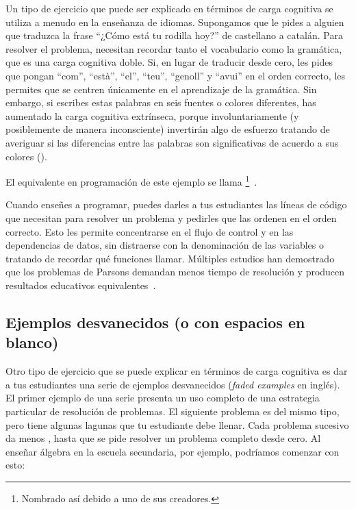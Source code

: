 Un tipo de ejercicio que puede ser explicado en términos de carga cognitiva
se utiliza a menudo en la enseñanza de idiomas.
Supongamos que le pides a alguien que traduzca la frase
``¿Cómo está tu rodilla hoy?'' de castellano a catalán.
Para resolver el problema, necesitan recordar tanto el vocabulario
como la gramática, que es una carga cognitiva doble.
Si, en lugar de traducir desde cero, les pides que pongan ``com'', ``està'', ``el'', ``teu'', ``genoll'' y ``avui'' en el orden correcto,
les permites que se centren únicamente en el aprendizaje de la gramática.
Sin embargo, si escribes estas palabras en seis fuentes o colores diferentes,
has aumentado la carga cognitiva extrínseca, porque involuntariamente
(y posiblemente de manera inconsciente) invertirán algo de esfuerzo tratando de averiguar
si las diferencias entre las palabras son significativas de acuerdo a sus colores ().


El equivalente en programación de este ejemplo
se llama \footnote{Nombrado así debido a uno de sus creadores.}~\cite{Pars2006}.

Cuando enseñes a programar,
puedes darles a tus estudiantes las líneas de código que necesitan para resolver un problema
y pedirles que las ordenen en el orden correcto.
Esto les permite concentrarse en el flujo de control y en las dependencias de datos,
sin distraerse con la denominación de las variables o tratando de recordar qué funciones llamar.
Múltiples estudios han demostrado que los problemas de Parsons demandan menos tiempo de resolución 
y producen resultados educativos equivalentes~\cite{Eric2017}.


\subsection*{Ejemplos desvanecidos (o con espacios en blanco)}

Otro tipo de ejercicio que se puede explicar en términos de carga cognitiva
es dar a tus estudiantes una serie de ejemplos desvanecidos (\emph{faded examples} en inglés).
El primer ejemplo de una serie presenta un uso completo de una estrategia
particular de resolución de problemas.
El siguiente problema es del mismo tipo,
pero tiene algunas lagunas que tu estudiante debe llenar.
Cada problema sucesivo da menos ,
hasta que se pide resolver un problema completo desde cero.
Al enseñar álgebra en la escuela secundaria,
por ejemplo,
podríamos comenzar con esto:


